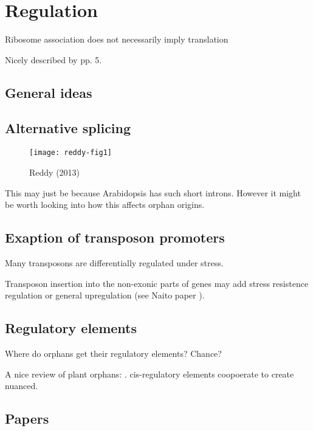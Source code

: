 \section{Regulation}
  Ribosome association does not necessarily imply translation
  \cite{guttman_ribosome_2013}

  Nicely described by \cite{tautz_evolutionary_2011} pp. 5.

  \subsection{General ideas}

  \subsection{Alternative splicing}

      \begin{figure}[h!]
        \centering
        \texttt{[image: reddy-fig1]}
        \caption{Reddy (2013) \cite{reddy_complexity_2013}}
      \end{figure}

      This may just be because Arabidopsis has such short introns. However it
      might be worth looking into how this affects orphan origins.

  \subsection{Exaption of transposon promoters}

    Many transposons are differentially regulated under stress.

    Transposon insertion into the non-exonic parts of genes may add stress
    resistence regulation or general upregulation (see Naito paper \cite{naito_unexpected_2009}).


  \subsection{Regulatory elements}

    Where do orphans get their regulatory elements? Chance?

    A nice review of plant orphans: \cite{priest_cis-regulatory_2009}.
    cis-regulatory elements coopoerate to create nuanced.

  \subsection{Papers}

